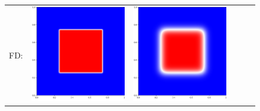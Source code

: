 \documentclass[12pt, reqno]{report}
\theoremstyle{definition}
\theoremstyle{remark}
\begin{document}
\begin{figure}[H]
\begin{tabular}{rccccc}
        FD: &
        \includegraphics[align = c, height=\subheight]{media_paper/cmap_FD_n=0.png} & 
        \includegraphics[align = c, height=\subheight]{media_paper/cmap_FD_n=50.png} & 

\end{tabular}
\end{figure}
\end{document}
